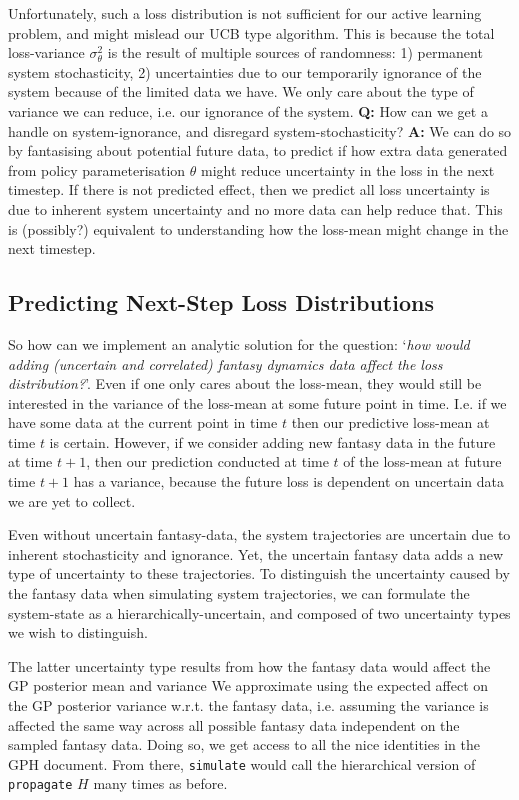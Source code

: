 \documentclass[a4paper,10pt]{article}
\begin{document}
 Unfortunately, such a loss distribution is not sufficient for our active learning problem,
 and might mislead our UCB type algorithm.
 This is because the total loss-variance
 $\sigma^2_\theta$
 is the result of multiple sources of randomness:
 1) permanent system stochasticity,
 2) uncertainties due to our temporarily ignorance of the system because of the limited data we have.
 We only care about the type of variance we can reduce,
 i.e. our ignorance of the system.
 \textbf{Q:} How can we get a handle on system-ignorance, and disregard system-stochasticity?
 \textbf{A:} We can do so by fantasising about potential future data,
 to predict if how extra data generated from policy parameterisation $\theta$
 might reduce uncertainty in the loss in the next timestep.
 If there is not predicted effect, then we predict all loss uncertainty is due to inherent system uncertainty
 and no more data can help reduce that.
 This is (possibly?) equivalent to understanding how the loss-mean might change in the next timestep.

\subsection{Predicting Next-Step Loss Distributions}
 So how can we implement an analytic solution for the question:
 `\textit{how would adding (uncertain and correlated) fantasy dynamics data affect the loss distribution?}'.
 Even if one only cares about the loss-mean,
 they would still be interested in the variance of the loss-mean at some future point in time.
 I.e. if we have some data at the current point in time $t$ then our predictive loss-mean at time $t$ is certain.
 However, if we consider adding new fantasy data in the future at time $t+1$,
 then our prediction conducted at time $t$ of the loss-mean at future time $t+1$ has a variance,
 because the future loss is dependent on uncertain data we are yet to collect.

 Even without uncertain fantasy-data, the system trajectories are uncertain due to inherent stochasticity and ignorance.
 Yet, the uncertain fantasy data adds a new type of uncertainty to these trajectories.
 To distinguish the uncertainty caused by the fantasy data when simulating system trajectories,
 we can formulate the system-state as a hierarchically-uncertain, and composed of two uncertainty types we wish to distinguish.

 The latter uncertainty type results from how the fantasy data would affect the GP posterior mean and variance
 We approximate using the expected affect on the GP posterior variance w.r.t. the fantasy data,
 i.e. assuming the variance is affected the same way across all possible fantasy data independent on the sampled fantasy data.
 Doing so, we get access to all the nice identities in the GPH document.
 From there, \texttt{simulate} would call the hierarchical version of \texttt{propagate} $H$ many times as before.
\end{document}
